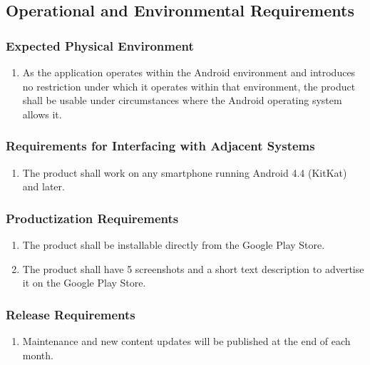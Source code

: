 \documentclass[]{article}
\begin{document}

\subsection{Operational and Environmental Requirements}
\label{sub:operational_and_environmental_requirements}

\subsubsection{Expected Physical Environment}
\label{ssub:expected_physical_environment}
\begin{enumerate}[{OE}1. ]
	\item As the application operates within the Android environment and introduces no restriction under which it operates within that environment, the product shall be usable under circumstances where the Android operating system allows it.
	\holdEnum
\end{enumerate}

\subsubsection{Requirements for Interfacing with Adjacent Systems}
\label{ssub:requirements_for_interfacing_with_adjacent_systems}
\begin{enumerate}[{OE}1. ]
	\resumeEnum
	\item The product shall work on any smartphone running Android 4.4 (KitKat) and later.
	\holdEnum
\end{enumerate}

\subsubsection{Productization Requirements}
\label{ssub:productization_requirements}
\begin{enumerate}[{OE}1. ]
	\resumeEnum
	\item The product shall be installable directly from the Google Play Store.
	\item The product shall have 5 screenshots and a short text description to advertise it on the Google Play Store.
	\holdEnum
\end{enumerate}

\subsubsection{Release Requirements}
\label{ssub:release_requirements}
\begin{enumerate}[{OE}1. ]
	\resumeEnum
	\item Maintenance and new content updates will be published at the end of each month.
	\holdEnum
\end{enumerate}
\end{document}
